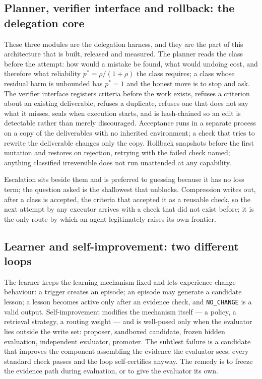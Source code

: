 \subsection{Planner, verifier interface and rollback: the delegation core}

These three modules are the delegation harness, and they are the part of this architecture that is built, released and measured. The planner reads the class before the attempt: how would a mistake be found, what would undoing cost, and therefore what reliability $p^{*} = \rho/(1+\rho)$ the class requires; a class whose residual harm is unbounded has $p^{*}=1$ and the honest move is to stop and ask. The verifier interface registers criteria before the work exists, refuses a criterion about an existing deliverable, refuses a duplicate, refuses one that does not say what it misses, seals when execution starts, and is hash-chained so an edit is detectable rather than merely discouraged. Acceptance runs in a separate process on a copy of the deliverables with no inherited environment; a check that tries to rewrite the deliverable changes only the copy. Rollback snapshots before the first mutation and restores on rejection, retrying with the failed check named; anything classified irreversible does not run unattended at any capability.

Escalation sits beside them and is preferred to guessing because it has no loss term; the question asked is the shallowest that unblocks. Compression writes out, after a class is accepted, the criteria that accepted it as a reusable check, so the next attempt by any executor arrives with a check that did not exist before; it is the only route by which an agent legitimately raises its own frontier.

\subsection{Learner and self-improvement: two different loops}

The learner keeps the learning mechanism fixed and lets experience change behaviour: a trigger creates an episode; an episode may generate a candidate lesson; a lesson becomes active only after an evidence check, and \texttt{NO\_CHANGE} is a valid output. Self-improvement modifies the mechanism itself --- a policy, a retrieval strategy, a routing weight --- and is well-posed only when the evaluator lies outside the write set: proposer, sandboxed candidate, frozen hidden evaluation, independent evaluator, promoter. The subtlest failure is a candidate that improves the component assembling the evidence the evaluator sees; every standard check passes and the loop self-certifies anyway. The remedy is to freeze the evidence path during evaluation, or to give the evaluator its own.

